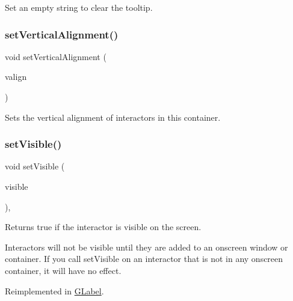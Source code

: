 Set an empty string to clear the tooltip. \mbox{\label{classsgl_1_1GContainer_a465537d012ad40704a011ad927ce435d}} 
\subsubsection{\texorpdfstring{set\+Vertical\+Alignment()}{setVerticalAlignment()}}
{\footnotesize\ttfamily void set\+Vertical\+Alignment (\begin{DoxyParamCaption}\item[{\mbox{\hyperlink{namespacesgl_a9c2ed22cfbd21f13df24ea193b310aee}{Vertical\+Alignment}}}]{valign }\end{DoxyParamCaption})\hspace{0.3cm}{\ttfamily [virtual]}}



Sets the vertical alignment of interactors in this container. 

\mbox{\label{classsgl_1_1GInteractor_a18e44e30b31525a243960ca3928125aa}} 
\subsubsection{\texorpdfstring{set\+Visible()}{setVisible()}}
{\footnotesize\ttfamily void set\+Visible (\begin{DoxyParamCaption}\item[{bool}]{visible }\end{DoxyParamCaption})\hspace{0.3cm}{\ttfamily [virtual]}, {\ttfamily [inherited]}}



Returns true if the interactor is visible on the screen. 

Interactors will not be visible until they are added to an onscreen window or container. If you call set\+Visible on an interactor that is not in any onscreen container, it will have no effect. 

Reimplemented in \mbox{\hyperlink{classsgl_1_1GLabel_afcc2a51afef8e2e61d8d9191386fb93f}{G\+Label}}.

